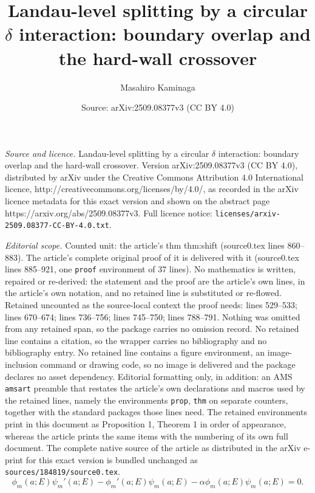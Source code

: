 \documentclass[10pt,a4paper]{amsart}
\title{Landau-level splitting by a circular $\delta$ interaction: boundary overlap and the hard-wall crossover}
\author{Masahiro Kaminaga}
\date{Source: arXiv:2509.08377v3 (CC BY 4.0)}
\begin{document}
\maketitle

\noindent\emph{Source and licence.} Landau-level splitting by a circular $\delta$ interaction: boundary overlap and the hard-wall crossover. Version arXiv:2509.08377v3 (CC BY 4.0), distributed by arXiv under the Creative Commons Attribution 4.0 International licence, http://creativecommons.org/licenses/by/4.0/, as recorded in the arXiv licence metadata for this exact version and shown on the abstract page https://arxiv.org/abs/2509.08377v3. Full licence notice: \texttt{licenses/arxiv-2509.08377-CC-BY-4.0.txt}.\par\smallskip

\noindent\textit{Editorial scope.} Counted unit: the article's thm thm:shift (source0.tex lines 860--883). The article's complete original proof of it is delivered with it (source0.tex lines 885--921, one \texttt{proof} environment of 37 lines). No mathematics is written, repaired or re-derived: the statement and the proof are the article's own lines, in the article's own notation, and no retained line is substituted or re-flowed.  Retained uncounted as the source-local context the proof needs: lines 529--533; lines 670--674; lines 736--756; lines 745--750; lines 788--791.  Nothing was omitted from any retained span, so the package carries no omission record.  No retained line contains a citation, so the wrapper carries no bibliography and no bibliography entry.  No retained line contains a figure environment, an image-inclusion command or drawing code, so no image is delivered and the package declares no asset dependency.  Editorial formatting only, in addition: an AMS \texttt{amsart} preamble that restates the article's own declarations and macros used by the retained lines, namely the environments \texttt{prop}, \texttt{thm} on separate counters, together with the standard packages those lines need.  The retained environments print in this document as Proposition 1, Theorem 1 in order of appearance, whereas the article prints the same items with the numbering of its own full document.  The complete native source of the article as distributed in the arXiv e-print for this exact version is bundled unchanged as \texttt{sources/184819/source0.tex}.
\begin{equation}\label{eq:detmatch}
\phi_m(a;E)\psi_m'(a;E)
-\phi_m'(a;E)\psi_m(a;E)
-\alpha\phi_m(a;E)\psi_m(a;E)=0.
\end{equation}
\end{document}
